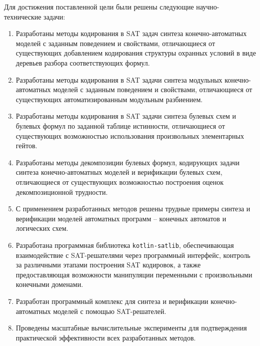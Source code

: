 \tasks
%
Для достижения поставленной цели были решены следующие научно-технические задачи:
\begin{enumerate}[beginpenalty=10000]
    \item Разработаны методы кодирования в SAT задач синтеза конечно-автоматных моделей с заданным поведением и свойствами, отличающиеся от существующих добавлением кодирования структуры охранных условий в виде деревьев разбора соответствующих формул.
    \item Разработаны методы кодирования в SAT задачи синтеза модульных конечно-автоматных моделей с заданным поведением и свойствами, отличающиеся от существующих автоматизированным модульным разбиением.
    \item Разработаны методы кодирования в SAT задачи синтеза булевых схем и булевых формул по заданной таблице истинности, отличающиеся от существующих возможностью использования произвольных элементарных гейтов.
    \item Разработаны методы декомпозиции булевых формул, кодирующих задачи синтеза конечно-автоматных моделей и верификации булевых схем, отличающиеся от существующих возможностью построения оценок декомпозиционной трудности.
    \item С применением разработанных методов решены трудные примеры синтеза и верификации моделей автоматных программ \--- конечных автоматов и логических схем.
    \item Разработана программная библиотека \texttt{kotlin-satlib}, обеспечивающая взаимодействие с SAT-решателями через программный интерфейс, контроль за различными этапами построения SAT кодировок, а также предоставляющая возможности манипуляции переменными с произвольными конечными доменами.
    \item Разработан программный комплекс  для синтеза и верификации конечно-автоматных моделей с помощью SAT-решателей.
    \item Проведены масштабные вычислительные эксперименты для подтверждения практической эффективности всех разработанных методов.
\end{enumerate}



